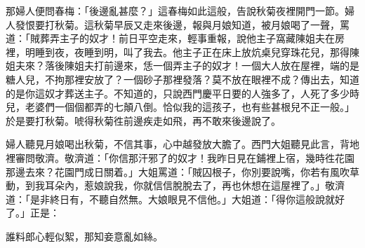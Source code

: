 那婦人便問春梅：「後邊亂甚麼？」這春梅如此這般，告說秋菊夜裡開門一節。婦人發恨要打秋菊。這秋菊早辰又走來後邊，報與月娘知道，被月娘喝了一聲，罵道：「賊葬弄主子的奴才！前日平空走來，輕事重報，說他主子窩藏陳姐夫在房裡，明睡到夜，夜睡到明，叫了我去。他主子正在床上放炕桌兒穿珠花兒，那得陳姐夫來？落後陳姐夫打前邊來，恁一個弄主子的奴才！一個大人放在屋裡，端的是糖人兒，不拘那裡安放了？一個砂子那裡發落？莫不放在眼裡不成？傳出去，知道的是你這奴才葬送主子。不知道的，只說西門慶平日要的人強多了，人死了多少時兒，老婆們一個個都弄的七顛八倒。恰似我的這孩子，也有些甚根兒不正一般。」{}於是要打秋菊。唬得秋菊徃前邊疾走如飛，再不敢來後邊說了。

婦人聽見月娘喝出秋菊，不信其事，心中越發放大膽了。{}西門大姐聽見此言，背地裡審問敬濟。敬濟道：「你信那汗邪了的奴才！我昨日見在鋪裡上宿，幾時徃花園那邊去來？花園門成日關着。」大姐罵道：「賊囚根子，你別要說嘴，你若有風吹草動，到我耳朵內，惹娘說我，你就信信脫脫去了，再也休想在這屋裡了。」敬濟道：「是非終日有，不聽自然無。大娘眼見不信他。」{}大姐道：「得你這般說就好了。」正是：

\begin{myquote}
誰料郎心輕似絮，那知妾意亂如絲。
\end{myquote}

